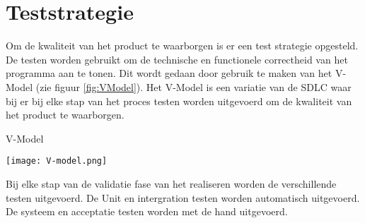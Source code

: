\section{Teststrategie}
\label{section:Teststrategie}
Om de kwaliteit van het product te waarborgen is er een test strategie opgesteld.
De testen worden gebruikt om de technische en functionele correctheid van het programma aan te tonen.
Dit wordt gedaan door gebruik te maken van het V-Model \parencite{VModel} (zie figuur \ref{fig:VModel}).
Het V-Model is een variatie van de SDLC waar bij er bij elke stap van het proces testen worden uitgevoerd om de kwaliteit van het product te waarborgen.

\whitespace
\begin{graphic}
    \captionsetup{type=figure}
    \caption{V-Model \parencite{VModel}}
    \texttt{[image: V-model.png]}
    \label{fig:VModel}
\end{graphic}

\whitespace
Bij elke stap van de validatie fase van het realiseren worden de verschillende testen uitgevoerd.
De Unit en intergration testen worden automatisch uitgevoerd.
De systeem en acceptatie testen worden met de hand uitgevoerd.

